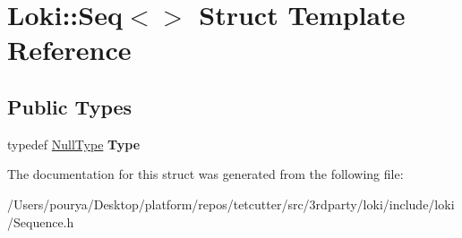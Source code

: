 \hypertarget{structLoki_1_1Seq_3_4}{}\section{Loki\+:\+:Seq$<$$>$ Struct Template Reference}
\label{structLoki_1_1Seq_3_4}
\subsection*{Public Types}
\begin{DoxyCompactItemize}
\item 
\hypertarget{structLoki_1_1Seq_3_4_a9f2205470474ab03d0a2bfe8fcee3031}{}typedef \hyperlink{classLoki_1_1NullType}{Null\+Type} {\bfseries Type}\label{structLoki_1_1Seq_3_4_a9f2205470474ab03d0a2bfe8fcee3031}

\end{DoxyCompactItemize}


The documentation for this struct was generated from the following file\+:\begin{DoxyCompactItemize}
\item 
/\+Users/pourya/\+Desktop/platform/repos/tetcutter/src/3rdparty/loki/include/loki/Sequence.\+h\end{DoxyCompactItemize}
